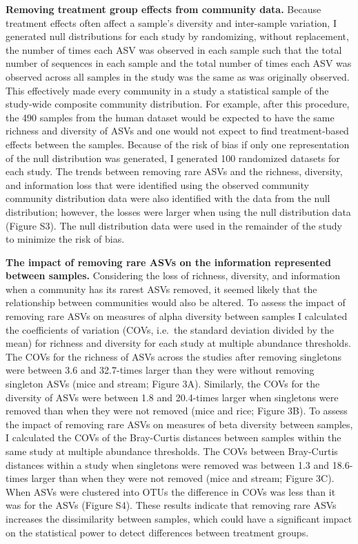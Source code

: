 \documentclass[
]{article}
\begin{document}
\textbf{Removing treatment group effects from community data.} Because
treatment effects often affect a sample's diversity and inter-sample
variation, I generated null distributions for each study by randomizing,
without replacement, the number of times each ASV was observed in each
sample such that the total number of sequences in each sample and the
total number of times each ASV was observed across all samples in the
study was the same as was originally observed. This effectively made
every community in a study a statistical sample of the study-wide
composite community distribution. For example, after this procedure, the
490 samples from the human dataset would be expected to have the same
richness and diversity of ASVs and one would not expect to find
treatment-based effects between the samples. Because of the risk of bias
if only one representation of the null distribution was generated, I
generated 100 randomized datasets for each study. The trends between
removing rare ASVs and the richness, diversity, and information loss
that were identified using the observed community community distribution
data were also identified with the data from the null distribution;
however, the losses were larger when using the null distribution data
(Figure S3). The null distribution data were used in the remainder of
the study to minimize the risk of bias.

\textbf{The impact of removing rare ASVs on the information represented
between samples.} Considering the loss of richness, diversity, and
information when a community has its rarest ASVs removed, it seemed
likely that the relationship between communities would also be altered.
To assess the impact of removing rare ASVs on measures of alpha
diversity between samples I calculated the coefficients of variation
(COVs, i.e.~the standard deviation divided by the mean) for richness and
diversity for each study at multiple abundance thresholds. The COVs for
the richness of ASVs across the studies after removing singletons were
between 3.6 and 32.7-times larger than they were without removing
singleton ASVs (mice and stream; Figure 3A). Similarly, the COVs for the
diversity of ASVs were between 1.8 and 20.4-times larger when singletons
were removed than when they were not removed (mice and rice; Figure 3B).
To assess the impact of removing rare ASVs on measures of beta diversity
between samples, I calculated the COVs of the Bray-Curtis distances
between samples within the same study at multiple abundance thresholds.
The COVs between Bray-Curtis distances within a study when singletons
were removed was between 1.3 and 18.6-times larger than when they were
not removed (mice and stream; Figure 3C). When ASVs were clustered into
OTUs the difference in COVs was less than it was for the ASVs (Figure
S4). These results indicate that removing rare ASVs increases the
dissimilarity between samples, which could have a significant impact on
the statistical power to detect differences between treatment groups.
\end{document}
